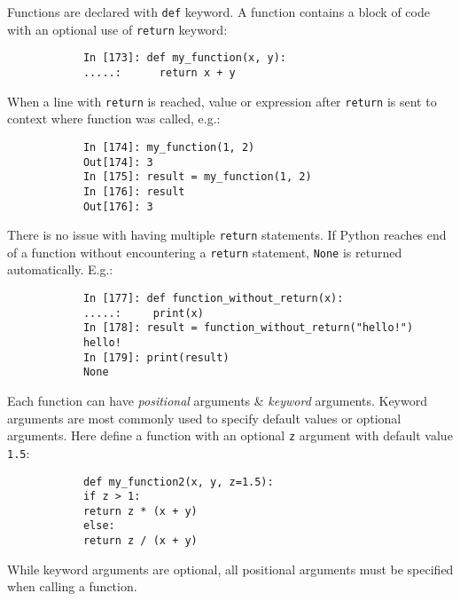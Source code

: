 \documentclass{article}
\begin{document}
\begin{itemize}
\begin{itemize}
		Functions are declared with {\tt def} keyword. A function contains a block of code with an optional use of {\tt return} keyword:
		\begin{verbatim}
			In [173]: def my_function(x, y):
			.....:      return x + y
		\end{verbatim}
		When a line with {\tt return} is reached, value or expression after {\tt return} is sent to context where function was called, e.g.:
		\begin{verbatim}
			In [174]: my_function(1, 2)
			Out[174]: 3
			In [175]: result = my_function(1, 2)
			In [176]: result
			Out[176]: 3
		\end{verbatim}
		There is no issue with having multiple {\tt return} statements. If Python reaches end of a function without encountering a {\tt return} statement, {\tt None} is returned automatically. E.g.:
		\begin{verbatim}
			In [177]: def function_without_return(x):
			.....:     print(x)
			In [178]: result = function_without_return("hello!")
			hello!
			In [179]: print(result)
			None
		\end{verbatim}
		Each function can have {\it positional} arguments \& {\it keyword} arguments. Keyword arguments are most commonly used to specify default values or optional arguments. Here define a function with an optional {\tt z} argument with default value {\tt1.5}:
		\begin{verbatim}
			def my_function2(x, y, z=1.5):
			if z > 1:
			return z * (x + y)
			else:
			return z / (x + y)
		\end{verbatim}
		While keyword arguments are optional, all positional arguments must be specified when calling a function.
		

\end{itemize}
\end{itemize}
\end{document}
